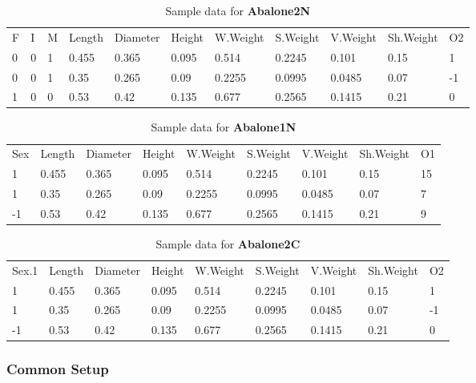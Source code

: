 \documentclass[a4paper,twoside]{article}
\begin{document}
\begin{enumerate}
\begin{table}
  \begin{tabular}{lllllllllll}
    F & I & M & Length & Diameter & Height & W.Weight & S.Weight & V.Weight & Sh.Weight & O2 \\
    0 & 0 & 1 & 0.455 & 0.365 & 0.095 & 0.514 & 0.2245 & 0.101 & 0.15 & 1 \\
    0 & 0 & 1 & 0.35 & 0.265 & 0.09 & 0.2255 & 0.0995 & 0.0485 & 0.07 & -1 \\
    1 & 0 & 0 & 0.53 & 0.42 & 0.135 & 0.677 & 0.2565 & 0.1415 & 0.21 & 0 \\
  \end{tabular}
  \label{tab:sample.data.2N}
  \caption{Sample data for \textbf{Abalone2N}}
\end{table}

\begin{table}
  \begin{tabular}{lllllllll}
    Sex & Length & Diameter & Height & W.Weight & S.Weight & V.Weight & Sh.Weight & O1 \\
    1 & 0.455 & 0.365 & 0.095 & 0.514 & 0.2245 & 0.101 & 0.15 & 15 \\
    1 & 0.35 & 0.265 & 0.09 & 0.2255 & 0.0995 & 0.0485 & 0.07 & 7 \\
    -1 & 0.53 & 0.42 & 0.135 & 0.677 & 0.2565 & 0.1415 & 0.21 & 9 \\
  \end{tabular}
  \label{tab:sample.data.1N}
  \caption{Sample data for \textbf{Abalone1N}}
\end{table}

\begin{table}
  \begin{tabular}{lllllllll}
    Sex.1 & Length & Diameter & Height & W.Weight & S.Weight & V.Weight & Sh.Weight & O2 \\
    1 & 0.455 & 0.365 & 0.095 & 0.514 & 0.2245 & 0.101 & 0.15 & 1 \\
    1 & 0.35 & 0.265 & 0.09 & 0.2255 & 0.0995 & 0.0485 & 0.07 & -1 \\
    -1 & 0.53 & 0.42 & 0.135 & 0.677 & 0.2565 & 0.1415 & 0.21 & 0 \\
  \end{tabular}
  \label{tab:sample.data.2C}
  \caption{Sample data for \textbf{Abalone2C}}
\end{table}

\subsubsection{Common Setup}


\end{enumerate}
\end{document}
